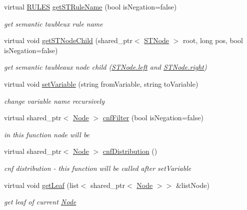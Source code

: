 \begin{DoxyCompactItemize}
virtual \hyperlink{proposition_2tableaux_2enum_8h_a70c93904c6a27d228050f922eb4fc3b8}{R\+U\+L\+ES} \hyperlink{class_node_a25b6581950988c2536a392a6874c8072}{get\+S\+T\+Rule\+Name} (bool is\+Negation=false)
\begin{DoxyCompactList}\small\item\em get semantic taubleux rule name \end{DoxyCompactList}\item 
virtual void \hyperlink{class_node_a1009cb6d84206c2b5eaa86580da59a7c}{get\+S\+T\+Node\+Child} (shared\+\_\+ptr$<$ \hyperlink{class_s_t_node}{S\+T\+Node} $>$ root, long pos, bool is\+Negation=false)
\begin{DoxyCompactList}\small\item\em get semantic taubleaux node child (\hyperlink{class_s_t_node_a19ba8bab4660bdeee0e897687b451a8b}{S\+T\+Node.\+left} and \hyperlink{class_s_t_node_a66d06118063fb739058f91c75b725e27}{S\+T\+Node.\+right}) \end{DoxyCompactList}\item 
virtual void \hyperlink{class_node_ae9bb2ba5b99e08fcd6f9aff0814a740f}{set\+Variable} (string from\+Variable, string to\+Variable)
\begin{DoxyCompactList}\small\item\em change variable name recursively \end{DoxyCompactList}\item 
virtual shared\+\_\+ptr$<$ \hyperlink{class_node}{Node} $>$ \hyperlink{class_node_ab5b01fd3c4efe0f2eaf7fc41653359b7}{cnf\+Filter} (bool is\+Negation=false)
\begin{DoxyCompactList}\small\item\em in this function node will be \end{DoxyCompactList}\item 
virtual shared\+\_\+ptr$<$ \hyperlink{class_node}{Node} $>$ \hyperlink{class_node_ae68e5138f0c1a6c79912e21bc8f39d48}{cnf\+Distribution} ()
\begin{DoxyCompactList}\small\item\em cnf distribution -\/ this function will be called after set\+Variable \end{DoxyCompactList}\item 
virtual void \hyperlink{class_node_a73ccf66e577caa428163477f3b4cfe4d}{get\+Leaf} (list$<$ shared\+\_\+ptr$<$ \hyperlink{class_node}{Node} $>$$>$ \&list\+Node)
\begin{DoxyCompactList}\small\item\em get leaf of current \hyperlink{class_node}{Node} \end{DoxyCompactList}\item 
$$
\end{DoxyCompactItemize}
